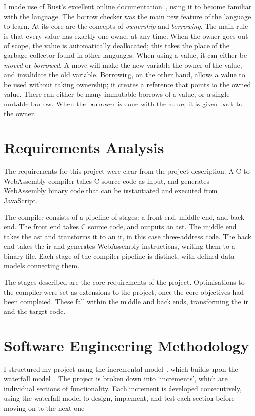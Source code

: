 \documentclass[00-main.tex]{subfiles}
\begin{document}
I made use of Rust's excellent online documentation~, using it to become familiar with the language.
The borrow checker was the main new feature of the language to learn.
At its core are the concepts of \emph{ownership} and \emph{borrowing}.
The main rule is that every value has exactly one owner at any time.
When the owner goes out of scope, the value is automatically deallocated; this takes the place of the garbage collector found in other languages.
When using a value, it can either be \emph{moved} or \emph{borrowed}.
A move will make the new variable the owner of the value, and invalidate the old variable.
Borrowing, on the other hand, allows a value to be used without taking ownership; it creates a reference that points to the owned value.
There can either be many immutable borrows of a value, or a single mutable borrow.
When the borrower is done with the value, it is given back to the owner.


\section{Requirements Analysis}

The requirements for this project were clear from the project description.
A C to WebAssembly compiler takes C source code as input, and generates WebAssembly binary code that can be instantiated and executed from JavaScript.

The compiler consists of a pipeline of stages: a front end, middle end, and back end.
The front end takes C source code, and outputs an \gls{ast}.
The middle end takes the \gls{ast} and transforms it to an \gls{ir}, in this case three-address code.
The back end takes the \gls{ir} and generates WebAssembly instructions, writing them to a binary file.
Each stage of the compiler pipeline is distinct, with defined data models connecting them.

The stages described are the core requirements of the project.
Optimisations to the compiler were set as extensions to the project, once the core objectives had been completed.
These fall within the middle and back ends, transforming the \gls{ir} and the target code.



\section{Software Engineering Methodology}

I structured my project using the incremental model~, which builds upon the waterfall model~.
The project is broken down into `increments', which are individual sections of functionality.
Each increment is developed consecutively, using the waterfall model to design, implement, and test each section before moving on to the next one.
\end{document}
